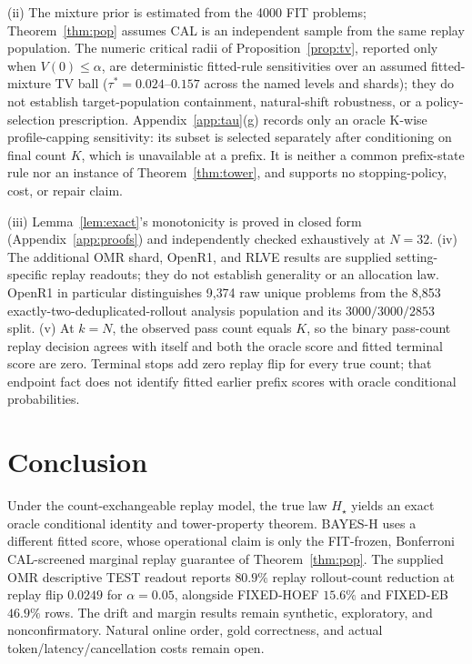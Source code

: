 \documentclass{article}
\theoremstyle{definition}
\theoremstyle{remark}
\newcommand{\trueH}{H_\star}
\begin{document}
(ii) The mixture prior is estimated from the 4000 FIT problems; Theorem~\ref{thm:pop}
assumes CAL is an independent sample from the same replay population. The
numeric critical radii of Proposition~\ref{prop:tv}, reported only when
$V(0)\le\alpha$, are
deterministic fitted-rule sensitivities over an assumed fitted-mixture TV ball
($\tau^*=0.024$--$0.157$ across the named levels and shards); they do not
establish target-population containment, natural-shift robustness, or a
policy-selection prescription. Appendix~\ref{app:tau}(g) records only an
oracle K-wise profile-capping sensitivity: its subset is selected separately
after conditioning on final count $K$, which is unavailable at a prefix. It
is neither a common prefix-state rule nor an instance of
Theorem~\ref{thm:tower}, and supports no stopping-policy, cost, or repair
claim.

(iii) Lemma~\ref{lem:exact}'s monotonicity is proved in closed form
(Appendix~\ref{app:proofs}) and independently checked exhaustively at
$N=32$. (iv) The additional OMR shard, OpenR1, and RLVE results are supplied
setting-specific replay readouts; they do not establish generality or an
allocation law. OpenR1 in particular distinguishes 9{,}374 raw unique
problems from the 8{,}853 exactly-two-deduplicated-rollout analysis population
and its $3000/3000/2853$ split. (v) At $k=N$, the observed pass count equals
$K$, so the binary pass-count replay decision agrees with itself and both the
oracle score and fitted terminal score are zero. Terminal stops add zero replay
flip for every true count; that endpoint fact does not identify fitted earlier
prefix scores with oracle conditional probabilities.

\section{Conclusion}
Under the count-exchangeable replay model, the true law $\trueH$ yields an
exact oracle conditional identity and tower-property theorem. BAYES-H uses a
different fitted score, whose operational claim is only the FIT-frozen,
Bonferroni CAL-screened marginal replay guarantee of
Theorem~\ref{thm:pop}. The supplied OMR descriptive TEST readout reports
$80.9\%$ replay rollout-count reduction at replay flip $0.0249$ for
$\alpha=0.05$, alongside FIXED-HOEF $15.6\%$ and FIXED-EB $46.9\%$ rows.
The drift and margin results remain synthetic, exploratory, and
nonconfirmatory. Natural online order, gold correctness, and actual
token/latency/cancellation costs remain open.
\end{document}
